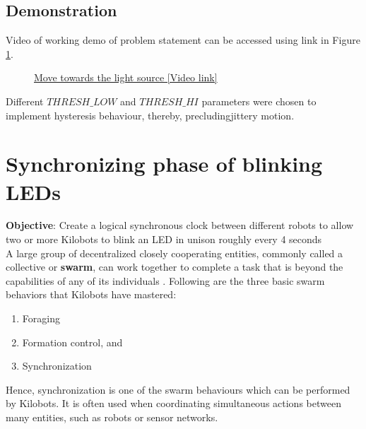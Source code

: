 \documentclass{report}[12pt]
\begin{document}
\subsection{Demonstration}
Video of working demo of problem statement can be accessed using link in Figure \ref{fig:move_towards_the_light}.
\begin{figure}[H]
	\centering
	\caption{\href{https://www.google.com/url?sa=j&url=https\%3A\%2F\%2Fphotos.app.goo.gl\%2FnUNghDg4nJygpzUu5&uct=1551610784&usg=G0tZGJ7iMN79F5qGk1QMw5rfodM.}{Move towards the light source [Video link]}}
	\label{fig:move_towards_the_light}
\end{figure}
Different $THRESH\_LOW$ and $THRESH\_HI$ parameters were chosen to implement hysteresis behaviour, thereby, precludingjittery motion.


\section{Synchronizing phase of blinking LEDs}
\textbf{Objective}: Create a logical synchronous clock between different 
robots to allow two or more Kilobots to blink an LED in unison roughly every 4 seconds \\

\noindent A large group of decentralized closely cooperating entities, commonly called a collective or \textbf{swarm}, can work together to complete a task that is beyond the capabilities of any of its individuals \cite{rubenstein2014kilobot}. Following are the three basic swarm behaviors that Kilobots have mastered: 
\begin{enumerate}
	\item  Foraging
	\item  Formation control, and 
	\item Synchronization
\end{enumerate}
Hence, synchronization is one of the swarm behaviours which can be performed by Kilobots. It is often used when coordinating simultaneous
actions between many entities, such as robots or sensor networks.\\
\end{document}
